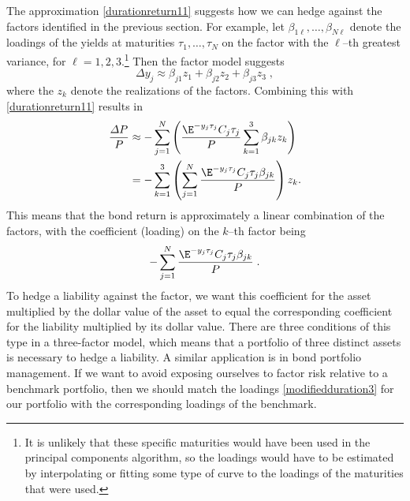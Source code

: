 The approximation \eqref{durationreturn11} suggests how we can hedge against the factors identified in the previous section.  For example, let $\beta_{1\ell}, \ldots, \beta_{N\ell}$ denote the loadings of the yields at maturities $\tau_1, \ldots, \tau_N$ on the factor with the $\ell$--th greatest variance, for $\ell=1, 2, 3$.\footnote{It is unlikely that these specific maturities would have been used in the principal components algorithm, so the loadings  would have to be estimated by interpolating or fitting some type of curve to the loadings of the maturities that were used.}  Then the factor model suggests
$$\varDelta y_j \approx \beta_{j1} z_1 + \beta_{j2} z_2 + \beta_{j3} z_3\; ,$$
where the $z_k$ denote the realizations of the factors.  Combining this with \eqref{durationreturn11} results in
\begin{align*}
\frac{\varDelta P}{P} &\approx -\sum_{j=1}^{N} \left(\frac{\E^{-y_j\tau_{j}}C_{j}\tau_j}{P}\sum_{k=1}^3 \beta_{jk}z_k \right)\\
&= -\sum_{k=1}^3 \left(\sum_{j=1}^{N} \frac{\E^{-y_j\tau_{j}}C_{j}\tau_j\beta_{jk}}{P}\right)z_k.
\end{align*}
This means that the bond return is approximately a linear combination of the factors, with the coefficient (loading) on the $k$--th factor being
\begin{equation}\label{modifiedduration3}
-\sum_{j=1}^{N} \frac{\E^{-y_j\tau_{j}}C_{j}\tau_j\beta_{jk}}{P}\;.
\end{equation}
To hedge a liability against the factor, we want this coefficient for the asset multiplied by the dollar value of the asset to equal the corresponding coefficient for the liability multiplied by its dollar value.  There are three conditions of this type in a three-factor model, which means that a portfolio of three distinct assets is necessary to hedge a liability.
A similar application is in bond portfolio management.  If we want to avoid exposing ourselves to factor risk relative to a benchmark portfolio, then we should match the loadings \eqref{modifiedduration3} for our portfolio with the corresponding loadings of the benchmark.


